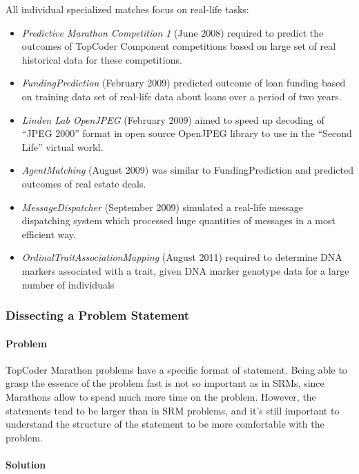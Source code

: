 All individual specialized matches focus on real-life tasks:

\begin{itemize}
\item
  \emph{Predictive Marathon Competition 1} (June 2008) required to
  predict the outcomes of TopCoder Component competitions based on large
  set of real historical data for these competitions.
\item
  \emph{FundingPrediction} (February 2009) predicted outcome of loan
  funding based on training data set of real-life data about loans over
  a period of two years.
\item
  \emph{Linden Lab OpenJPEG} (February 2009) aimed to speed up decoding
  of ``JPEG 2000'' format in open source OpenJPEG library to use in the
  ``Second Life'' virtual world.
\item
  \emph{AgentMatching} (August 2009) was similar to FundingPrediction
  and predicted outcomes of real estate deals.
\item
  \emph{MessageDispatcher }(September 2009) simulated a real-life
  message dispatching system which processed huge quantities of messages
  in a most efficient way.
\item
  \emph{OrdinalTraitAssociationMapping }(August 2011) required to
  determine DNA markers associated with a trait, given DNA marker
  genotype data for a large number of individuals
\end{itemize}

\hypertarget{dissecting-a-problem-statement}{%
\subsubsection{Dissecting a Problem
Statement}\label{dissecting-a-problem-statement}}

\hypertarget{problem-1}{%
\paragraph{Problem}\label{problem-1}}

TopCoder Marathon problems have a specific format of statement. Being
able to grasp the essence of the problem fast is not so important as in
SRMs, since Marathons allow to spend much more time on the problem.
However, the statements tend to be larger than in SRM problems, and it's
still important to understand the structure of the statement to be more
comfortable with the problem.

\hypertarget{solution-1}{%
\paragraph{Solution}\label{solution-1}}

